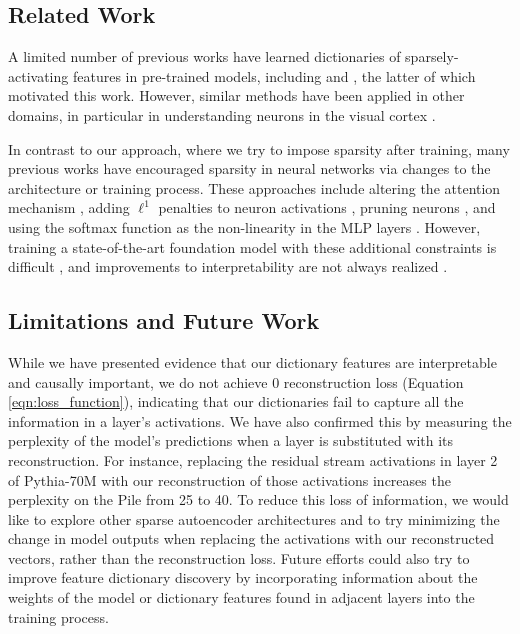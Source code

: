\subsection{Related Work}

A limited number of previous works have learned dictionaries of sparsely-activating features in pre-trained models, including \citet{yun2021transformer} and \citet{sharkey2023technical}, the latter of which motivated this work. However, similar methods have been applied in other domains, in particular in understanding neurons in the visual cortex \citep{olshausen2004sparse, wright2022high}. 

In contrast to our approach, where we try to impose sparsity after training, many previous works have encouraged sparsity in neural networks via changes to the architecture or training process. These approaches include altering the attention mechanism \citep{correia2019adaptively}, adding $\ell^1$ penalties to neuron activations \citep{kasioumis2021elite, georgiadis2019accelerating}, pruning neurons \citep{frankle2018lottery}, and using the softmax function as the non-linearity in the MLP layers \citep{elhage2022solu}. However, training a state-of-the-art foundation model with these additional constraints is difficult \citep{elhage2022solu}, and improvements to interpretability are not always realized \citep{Meister2021IsSA}.

\subsection{Limitations and Future Work}

While we have presented evidence that our dictionary features are interpretable and causally important, we do not achieve 0 reconstruction loss (Equation \ref{eqn:loss_function}), indicating that our dictionaries fail to capture all the information in a layer's activations. We have also confirmed this by measuring the perplexity of the model's predictions when a layer is substituted with its reconstruction. For instance, replacing the residual stream activations in layer 2 of Pythia-70M with our reconstruction of those activations increases the perplexity on the Pile \citep{gao2020pile} from 25 to 40. To reduce this loss of information, we would like to explore other sparse autoencoder architectures and to try minimizing the change in model outputs when replacing the activations with our reconstructed vectors, rather than the reconstruction loss. Future efforts could also try to improve feature dictionary discovery by incorporating information about the weights of the model or dictionary features found in adjacent layers into the training process.

